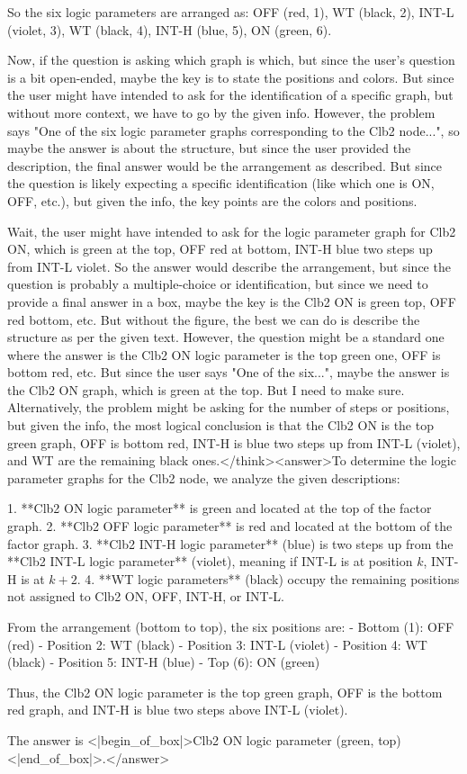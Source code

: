 So the six logic parameters are arranged as: OFF (red, 1), WT (black, 2), INT-L (violet, 3), WT (black, 4), INT-H (blue, 5), ON (green, 6). 

Now, if the question is asking which graph is which, but since the user's question is a bit open-ended, maybe the key is to state the positions and colors. But since the user might have intended to ask for the identification of a specific graph, but without more context, we have to go by the given info. However, the problem says "One of the six logic parameter graphs corresponding to the Clb2 node...", so maybe the answer is about the structure, but since the user provided the description, the final answer would be the arrangement as described. But since the question is likely expecting a specific identification (like which one is ON, OFF, etc.), but given the info, the key points are the colors and positions. 

Wait, the user might have intended to ask for the logic parameter graph for Clb2 ON, which is green at the top, OFF red at bottom, INT-H blue two steps up from INT-L violet. So the answer would describe the arrangement, but since the question is probably a multiple-choice or identification, but since we need to provide a final answer in a box, maybe the key is the Clb2 ON is green top, OFF red bottom, etc. But without the figure, the best we can do is describe the structure as per the given text. However, the question might be a standard one where the answer is the Clb2 ON logic parameter is the top green one, OFF is bottom red, etc. But since the user says "One of the six...", maybe the answer is the Clb2 ON graph, which is green at the top. But I need to make sure. Alternatively, the problem might be asking for the number of steps or positions, but given the info, the most logical conclusion is that the Clb2 ON is the top green graph, OFF is bottom red, INT-H is blue two steps up from INT-L (violet), and WT are the remaining black ones.</think><answer>To determine the logic parameter graphs for the Clb2 node, we analyze the given descriptions:  

1. **Clb2 ON logic parameter** is green and located at the top of the factor graph.  
2. **Clb2 OFF logic parameter** is red and located at the bottom of the factor graph.  
3. **Clb2 INT-H logic parameter** (blue) is two steps up from the **Clb2 INT-L logic parameter** (violet), meaning if INT-L is at position \( k \), INT-H is at \( k + 2 \).  
4. **WT logic parameters** (black) occupy the remaining positions not assigned to Clb2 ON, OFF, INT-H, or INT-L.  

From the arrangement (bottom to top), the six positions are:  
- Bottom (1): OFF (red)  
- Position 2: WT (black)  
- Position 3: INT-L (violet)  
- Position 4: WT (black)  
- Position 5: INT-H (blue)  
- Top (6): ON (green)  

Thus, the Clb2 ON logic parameter is the top green graph, OFF is the bottom red graph, and INT-H is blue two steps above INT-L (violet).  

The answer is <|begin_of_box|>Clb2 ON logic parameter (green, top)<|end_of_box|>.</answer>